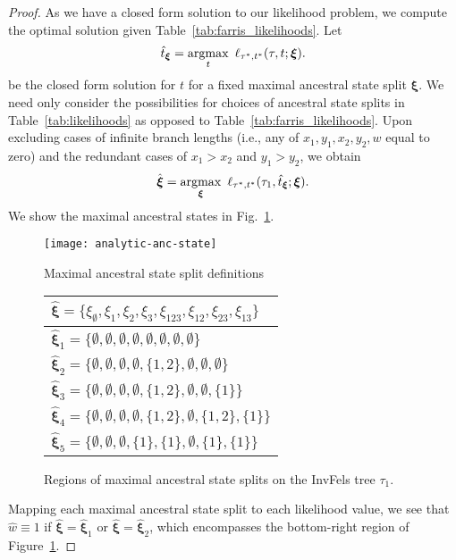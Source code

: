 \begin{proof}
As we have a closed form solution to our likelihood problem, we compute the optimal solution given Table~\ref{tab:farris_likelihoods}.
Let
\[
\hat{t}_{\boldsymbol\xi} = \operatorname*{argmax}_{t} \ \ell_{\tau^*,t^*}(\tau, t; \boldsymbol\xi).
\]
be the closed form solution for $t$ for a fixed maximal ancestral state split $\boldsymbol\xi$.
We need only consider the possibilities for choices of ancestral state splits in Table~\ref{tab:likelihoods} as opposed to Table~\ref{tab:farris_likelihoods}.
Upon excluding cases of infinite branch lengths (i.e., any of $x_1,y_1,x_2,y_2,w$ equal to zero) and the redundant cases of $x_1 > x_2$ and $y_1 > y_2$, we obtain
\[
\hat{\boldsymbol\xi} =
    \operatorname*{argmax}_{\boldsymbol\xi} \ \ell_{\tau^*,t^*}(\tau_1, \hat{t}_{\boldsymbol\xi}; \boldsymbol\xi).
\]
We show the maximal ancestral states in Fig.~\ref{fig:max-anc-state}.

\begin{figure}
    \begin{minipage}{\linewidth}
        \centering
        \texttt{[image: analytic-anc-state]}
        \label{ }
    \end{minipage}
    \begin{minipage}{\linewidth}
        \centering
        Maximal ancestral state split definitions
        \begin{tabular}{l}
        \hline
        $\hat{\boldsymbol\xi} = \{\xi_{\emptyset},\xi_{1},\xi_{2},\xi_{3},\xi_{123},\xi_{12},\xi_{23},\xi_{13}\}$\\
        \hline
        $\hat{\boldsymbol\xi}_1 = \{\emptyset,\emptyset,\emptyset,\emptyset,\emptyset,\emptyset,\emptyset,\emptyset\}$\\
        $\hat{\boldsymbol\xi}_2 = \{\emptyset,\emptyset,\emptyset,\emptyset,\{1,2\},\emptyset,\emptyset,\emptyset\}$\\
        $\hat{\boldsymbol\xi}_3 = \{\emptyset,\emptyset,\emptyset,\emptyset,\{1,2\},\emptyset,\emptyset,\{1\}\}$\\
        $\hat{\boldsymbol\xi}_4 = \{\emptyset,\emptyset,\emptyset,\emptyset,\{1,2\},\emptyset,\{1,2\},\{1\}\}$\\
        $\hat{\boldsymbol\xi}_5 = \{\emptyset,\emptyset,\emptyset,\{1\},\{1\},\emptyset,\{1\},\{1\}\}$\\
        \hline
        \end{tabular}
    \end{minipage}
\caption{
Regions of maximal ancestral state splits on the InvFels tree $\tau_1$.
}
\label{fig:max-anc-state}
\end{figure}

Mapping each maximal ancestral state split to each likelihood value, we see that $\hat{w}\equiv 1$ if $\hat{\boldsymbol\xi}=\hat{\boldsymbol\xi}_1$ or $\hat{\boldsymbol\xi}=\hat{\boldsymbol\xi}_2$, which encompasses the bottom-right region of Figure~\ref{fig:max-anc-state}.
\end{proof}

